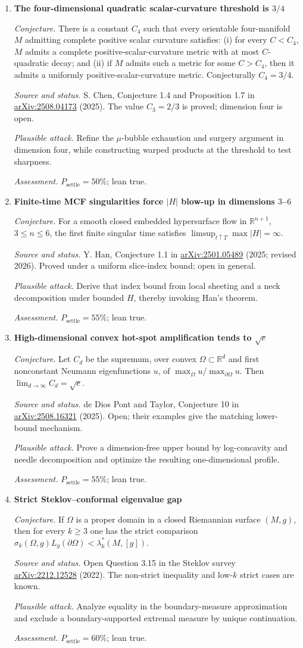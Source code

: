 \documentclass[11pt]{article}
\newcommand{\cand}[5]{%
  \item \textbf{#1}\par
  \emph{Conjecture.} #2\par
  \emph{Source and status.} #3\par
  \emph{Plausible attack.} #4\par
  \emph{Assessment.} #5
}
\newcommand{\psettle}{P_{\mathrm{settle}}}
\begin{document}
\begin{enumerate}[label=\textbf{M\arabic*.}]
\cand{The four-dimensional quadratic scalar-curvature threshold is $3/4$}
{There is a constant $C_4$ such that every orientable four-manifold $M$ admitting complete positive scalar curvature satisfies: (i) for every $C<C_4$, $M$ admits a complete positive-scalar-curvature metric with at most $C$-quadratic decay; and (ii) if $M$ admits such a metric for some $C>C_4$, then it admits a uniformly positive-scalar-curvature metric.  Conjecturally $C_4=3/4$.}
{S. Chen, Conjecture 1.4 and Proposition 1.7 in \href{https://arxiv.org/abs/2508.04173}{arXiv:2508.04173} (2025).  The value $C_3=2/3$ is proved; dimension four is open.}
{Refine the $\mu$-bubble exhaustion and surgery argument in dimension four, while constructing warped products at the threshold to test sharpness.}
{$\psettle=50\%$; lean true.}

\cand{Finite-time MCF singularities force $|H|$ blow-up in dimensions $3$--$6$}
{For a smooth closed embedded hypersurface flow in $\mathbb R^{n+1}$, $3\le n\le6$, the first finite singular time satisfies $\limsup_{t\uparrow T}\max|H|=\infty$.}
{Y. Han, Conjecture 1.1 in \href{https://arxiv.org/abs/2501.05489}{arXiv:2501.05489} (2025; revised 2026).  Proved under a uniform slice-index bound; open in general.}
{Derive that index bound from local sheeting and a neck decomposition under bounded $H$, thereby invoking Han's theorem.}
{$\psettle=55\%$; lean true.}

\cand{High-dimensional convex hot-spot amplification tends to $\sqrt e$}
{Let $C_d$ be the supremum, over convex $\Omega\subset\mathbb R^d$ and first nonconstant Neumann eigenfunctions $u$, of $\max_\Omega u/\max_{\partial\Omega}u$.  Then $\lim_{d\to\infty}C_d=\sqrt e$.}
{de Dios Pont and Taylor, Conjecture 10 in \href{https://arxiv.org/abs/2508.16321}{arXiv:2508.16321} (2025).  Open; their examples give the matching lower-bound mechanism.}
{Prove a dimension-free upper bound by log-concavity and needle decomposition and optimize the resulting one-dimensional profile.}
{$\psettle=55\%$; lean true.}

\cand{Strict Steklov--conformal eigenvalue gap}
{If $\Omega$ is a proper domain in a closed Riemannian surface $(M,g)$, then for every $k\ge3$ one has the strict comparison $\sigma_k(\Omega,g)L_g(\partial\Omega)<\lambda_k^*(M,[g])$.}
{Open Question 3.15 in the Steklov survey \href{https://arxiv.org/abs/2212.12528}{arXiv:2212.12528} (2022).  The non-strict inequality and low-$k$ strict cases are known.}
{Analyze equality in the boundary-measure approximation and exclude a boundary-supported extremal measure by unique continuation.}
{$\psettle=60\%$; lean true.}


\end{enumerate}
\end{document}
